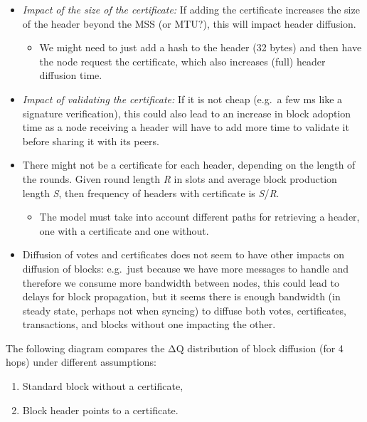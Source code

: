 \documentclass[10pt]{article}
\providecommand{\tightlist}{%
  \setlength{\itemsep}{0pt}\setlength{\parskip}{0pt}}
\begin{document}
\begin{itemize}
\tightlist
\item
  \emph{Impact of the size of the certificate:} If adding the
  certificate increases the size of the header beyond the MSS (or MTU?),
  this will impact header diffusion.

  \begin{itemize}
  \tightlist
  \item
    We might need to just add a hash to the header (32 bytes) and then
    have the node request the certificate, which also increases (full)
    header diffusion time.
  \end{itemize}
\item
  \emph{Impact of validating the certificate:} If it is not cheap
  (e.g.~a few ms like a signature verification), this could also lead to
  an increase in block adoption time as a node receiving a header will
  have to add more time to validate it before sharing it with its peers.
\item
  There might not be a certificate for each header, depending on the
  length of the rounds. Given round length \emph{R} in slots and average
  block production length \emph{S}, then frequency of headers with
  certificate is \emph{S}/\emph{R}.

  \begin{itemize}
  \tightlist
  \item
    The model must take into account different paths for retrieving a
    header, one with a certificate and one without.
  \end{itemize}
\item
  Diffusion of votes and certificates does not seem to have other
  impacts on diffusion of blocks: e.g.~just because we have more
  messages to handle and therefore we consume more bandwidth between
  nodes, this could lead to delays for block propagation, but it seems
  there is enough bandwidth (in steady state, perhaps not when syncing)
  to diffuse both votes, certificates, transactions, and blocks without
  one impacting the other.
\end{itemize}

The following diagram compares the ΔQ distribution of block diffusion
(for 4 hops) under different assumptions:

\begin{enumerate}
\def\labelenumi{\arabic{enumi}.}
\tightlist
\item
  Standard block without a certificate,
\item
  Block header points to a certificate.
\end{enumerate}
\end{document}
